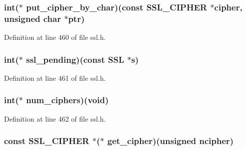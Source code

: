 \subsubsection[{\texorpdfstring{put\+\_\+cipher\+\_\+by\+\_\+char}{put_cipher_by_char}}]{\setlength{\rightskip}{0pt plus 5cm}int($\ast$ put\+\_\+cipher\+\_\+by\+\_\+char)(const {\bf S\+S\+L\+\_\+\+C\+I\+P\+H\+ER} $\ast$cipher, unsigned char $\ast$ptr)}\hypertarget{structssl__method__st_a16cef3ae5be3b497ea2191a776c02a81}{}\label{structssl__method__st_a16cef3ae5be3b497ea2191a776c02a81}


Definition at line 460 of file ssl.\+h.

\subsubsection[{\texorpdfstring{ssl\+\_\+pending}{ssl_pending}}]{\setlength{\rightskip}{0pt plus 5cm}int($\ast$ ssl\+\_\+pending)(const {\bf S\+SL} $\ast$s)}\hypertarget{structssl__method__st_ae027b68f80240fd6911ac45c680780cc}{}\label{structssl__method__st_ae027b68f80240fd6911ac45c680780cc}


Definition at line 461 of file ssl.\+h.

\subsubsection[{\texorpdfstring{num\+\_\+ciphers}{num_ciphers}}]{\setlength{\rightskip}{0pt plus 5cm}int($\ast$ num\+\_\+ciphers)({\bf void})}\hypertarget{structssl__method__st_a4840f98f78abb79a165f15dd9acc9fdc}{}\label{structssl__method__st_a4840f98f78abb79a165f15dd9acc9fdc}


Definition at line 462 of file ssl.\+h.

\subsubsection[{\texorpdfstring{get\+\_\+cipher}{get_cipher}}]{\setlength{\rightskip}{0pt plus 5cm}const {\bf S\+S\+L\+\_\+\+C\+I\+P\+H\+ER} $\ast$($\ast$ get\+\_\+cipher)(unsigned ncipher)}\hypertarget{structssl__method__st_a26c139f7abb7927211228996a991da65}{}\label{structssl__method__st_a26c139f7abb7927211228996a991da65}


